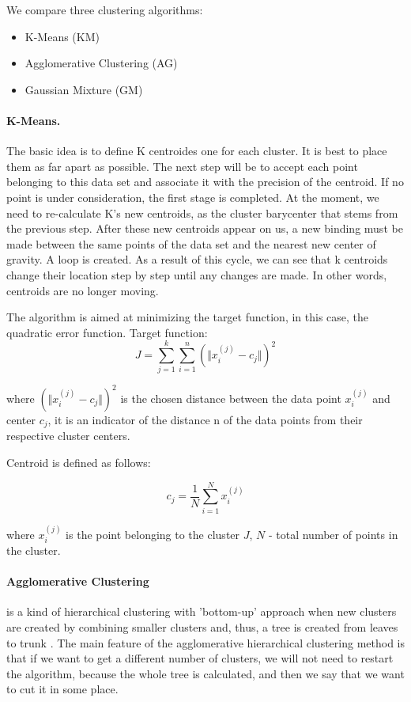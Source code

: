 \documentclass[11pt]{article}
\begin{document}
We compare three clustering algorithms:

\begin{itemize}
\item K-Means (KM)
\item Agglomerative Clustering (AG)
\item Gaussian Mixture (GM)
\end{itemize}


\paragraph{K-Means.} The basic idea is to define K centroides one for each cluster. It is best to place them as far apart as possible. The next step will be to accept each point belonging to this data set and associate it with the precision of the centroid. If no point is under consideration, the first stage is completed. At the moment, we need to re-calculate K's new centroids, as the cluster barycenter that stems from the previous step. After these new centroids appear on us, a new binding must be made between the same points of the data set and the nearest new center of gravity. A loop is created. As a result of this cycle, we can see that k centroids change their location step by step until any changes are made. In other words, centroids are no longer moving.

The algorithm is aimed at minimizing the target function, in this case, the quadratic error function. Target function:
\begin{equation}
J = \sum_{j=1}^{k} \sum_{i=1}^{n} (\Vert x_{i}^{(j)} - c_{j} \Vert)^{2}
\end{equation}

where $(\Vert x_{i}^{(j)} - c_{j} \Vert)^{2}$ is the chosen distance between the data point $x_{i}^{(j)}$ and center $c_{j}$, it is an indicator of the distance n of the data points from their respective cluster centers.

Centroid is defined as follows:

\begin{equation}
c_{j} = \dfrac{1}{N} \sum_{i=1}^{N} x_{i}^{(j)}
\end{equation}

where $x_{i}^{(j)}$ is the point belonging to the cluster $J$, $N$ - total number of points in the cluster.

\paragraph{Agglomerative Clustering} is a kind of hierarchical clustering with 'bottom-up' approach when new clusters are created by combining smaller clusters and, thus, a tree is created from leaves to trunk \cite{ward63:_hierar_group_optim_objec_funct}. The main feature of the agglomerative hierarchical clustering method is that if we want to get a different number of clusters, we will not need to restart the algorithm, because the whole tree is calculated, and then we say that we want to cut it in some place.
\end{document}
